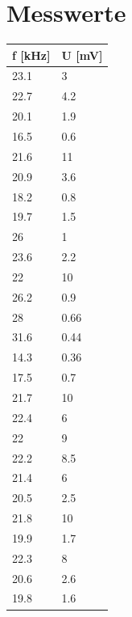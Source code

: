 \section{Messwerte}

\begin{minipage}{\linewidth}
    \begin{table}[H]
        \centering
    \begin{tabular}{ll}
        \toprule
        f [kHz] & U [mV] \\
        \midrule
        23.1  & 3 \\    
        22.7  & 4.2 \\    
        20.1  & 1.9 \\    
        16.5  & 0.6 \\    
        21.6  & 11 \\    
        20.9  & 3.6 \\    
        18.2  & 0.8 \\    
        19.7  & 1.5 \\    
        26    & 1 \\    
        23.6  & 2.2 \\    
        22    & 10 \\    
        26.2  & 0.9 \\    
        28    & 0.66 \\    
        31.6  & 0.44 \\    
        14.3  & 0.36 \\    
        17.5  & 0.7 \\    
        21.7  & 10 \\    
        22.4  & 6 \\    
        22    & 9 \\    
        22.2  & 8.5 \\    
        21.4  & 6 \\    
        20.5  & 2.5 \\    
        21.8  & 10 \\    
        19.9  & 1.7 \\    
        22.3  & 8 \\    
        20.6  & 2.6 \\    
        19.8  & 1.6 \\    
        \bottomrule   
    \end{tabular}
    
    \label{tab:1}
\end{table}
\end{minipage}


